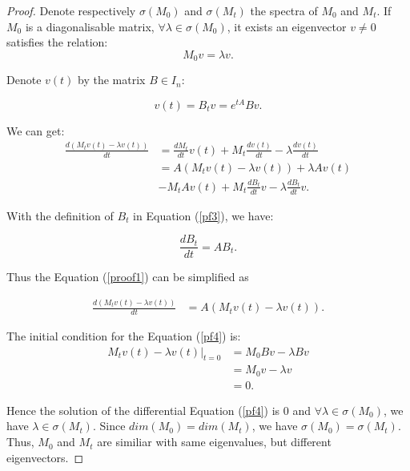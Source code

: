 \begin{proof}
	
	
	Denote respectively $\sigma(M_0)$ and $\sigma(M_t)$ the spectra of $M_0$ and $M_t$. If $M_0$ is a diagonalisable matrix, $\forall \lambda \in \sigma(M_0)$, it exists an eigenvector $v \neq 0$ satisfies the relation:
	\begin{equation}
	M_0 v=\lambda v.
	\end{equation}
	
	Denote $v(t)$ by the matrix $B \in {I}_{n}$:
	
	\begin{equation}
	\label{pf3}
	v(t) = B_tv = e^{tA}Bv.
	\end{equation}
	
	We can get: 
	\begin{equation}
	\begin{aligned}
	\label{proof1}
	\frac{d(M_tv(t) - \lambda v(t))}{dt} &= \frac{dM_t}{dt}v(t) + M_t \frac{dv(t)}{dt} - \lambda \frac{dv(t)}{dt} \\
	&=A(M_t v(t)-\lambda v(t)) + \lambda Av(t) \\&-M_tAv(t)+M_t \frac{dB_t}{dt} v - \lambda \frac{dB_t}{dt} v.
	\end{aligned}
	\end{equation}
	
	With the definition of $B_t$ in Equation (\ref{pf3}), we have:
	
	\begin{equation}
	\frac{dB_t}{dt} = AB_t.
	\end{equation}
	
	Thus the Equation (\ref{proof1}) can be simplified as 
	
	\begin{equation}
	\label{pf4}
	\begin{aligned}
	\frac{d(M_tv(t) - \lambda v(t))}{dt} &=A(M_t v(t) - \lambda v(t)).
	\end{aligned}
	\end{equation}
	
	The initial condition for the Equation (\ref{pf4}) is:
	\begin{equation}
	\begin{aligned}
	M_tv(t) - \lambda v(t)|_{t=0} &= M_0 B v - \lambda B v \\
	& = M_0 v - \lambda v \\
	&= 0.
	\end{aligned}
	\end{equation}
	
	Hence the solution of the differential Equation (\ref{pf4})  is $0$ and $\forall \lambda \in \sigma(M_0)$, we have $\lambda \in \sigma(M_t)$. Since $dim(M_0) = dim(M_t)$, we have $\sigma(M_0) = \sigma(M_t)$. Thus, $M_0$ and $M_t$ are similiar with same eigenvalues, but different eigenvectors.
	
	
\end{proof}

